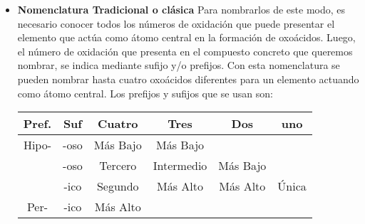\documentclass[11pt,fleqn]{book} %
\begin{document}
\begin{itemize}
	\item \textbf{Nomenclatura Tradicional o clásica} Para nombrarlos de este modo, es necesario conocer todos los números de oxidación que
	puede presentar el elemento que actúa como átomo central en la formación de oxoácidos.
	Luego, el número de oxidación que presenta en el compuesto concreto que queremos
	nombrar, se indica mediante sufijo y/o prefijos. Con esta nomenclatura se pueden nombrar hasta cuatro oxoácidos diferentes para un elemento actuando como átomo central. Los prefijos y sufijos que se usan son:\\
	\begin{table} [h!]
		\centering
		\begin{tabular}{|c|c||c|c|c|c|} \hline
			Pref.&Suf&Cuatro&Tres&Dos&uno\\ \hline
			Hipo-&-oso&Más Bajo&Más Bajo&&\\ \hline
			&-oso&Tercero&Intermedio&Más Bajo&\\ \hline
			&-ico&Segundo&Más Alto&Más Alto&Única\\ \hline
			Per-&-ico&Más Alto&&&\\ \hline
		\end{tabular}
	

\end{table}
\end{itemize}
\end{document}
